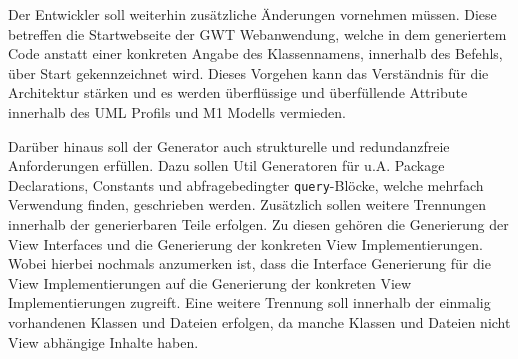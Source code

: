 Der Entwickler soll weiterhin zusätzliche Änderungen vornehmen müssen. Diese
betreffen die Startwebseite der GWT Webanwendung, welche in dem generiertem
Code anstatt einer konkreten Angabe des Klassennamens, innerhalb des Befehls,
über \glqq{}Start\grqq{} gekennzeichnet wird. Dieses Vorgehen kann das
Verständnis für die Architektur stärken und es werden überflüssige und überfüllende
Attribute innerhalb des UML Profils und M1 Modells vermieden.

Darüber hinaus soll der Generator auch strukturelle und redundanzfreie
Anforderungen erfüllen. Dazu sollen \glqq{}Util\grqq{} Generatoren für u.A.
Package Declarations, Constants und abfragebedingter \texttt{query}-Blöcke,
welche mehrfach Verwendung finden, geschrieben werden. Zusätzlich sollen weitere
Trennungen innerhalb der generierbaren Teile erfolgen. Zu diesen gehören die
Generierung der View Interfaces und die Generierung der konkreten View Implementierungen. Wobei
hierbei nochmals anzumerken ist, dass die Interface Generierung für die View
Implementierungen auf die Generierung der konkreten View Implementierungen
zugreift. Eine weitere Trennung soll innerhalb der einmalig vorhandenen Klassen
und Dateien erfolgen, da manche Klassen und Dateien nicht View abhängige Inhalte
haben.
